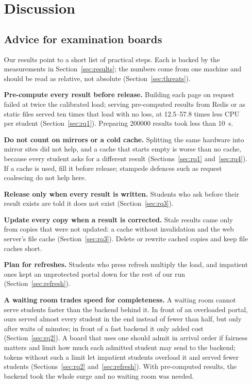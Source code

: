 \section{Discussion}
\label{sec:discussion}

\subsection{Advice for examination boards}

Our results point to a short list of practical steps. Each is backed by the
measurements in Section~\ref{sec:results}; the numbers come from one machine
and should be read as relative, not absolute (Section~\ref{sec:threats}).

\textbf{Pre-compute every result before release.} Building each page on
request failed at twice the calibrated load; serving pre-computed results from
Redis or as static files served ten times that load with no loss, at
12.5--57.8 times less CPU per student (Section~\ref{sec:rq1}). Preparing
\num{200000} results took less than \SI{10}{s}.

\textbf{Do not count on mirrors or a cold cache.} Splitting the same hardware
into mirror sites did not help, and a cache that starts empty is worse than no
cache, because every student asks for a different result
(Sections~\ref{sec:rq1} and~\ref{sec:rq4}). If a cache is used, fill it before
release; stampede defences such as request coalescing do not help here.

\textbf{Release only when every result is written.} Students who ask before
their result exists are told it does not exist (Section~\ref{sec:rq3}).

\textbf{Update every copy when a result is corrected.} Stale results came only
from copies that were not updated: a cache without invalidation and the web
server's file cache (Section~\ref{sec:rq3}). Delete or rewrite cached copies
and keep file caches short.

\textbf{Plan for refreshes.} Students who press refresh multiply the load, and
impatient ones kept an unprotected portal down for the rest of our run
(Section~\ref{sec:refresh}).

\textbf{A waiting room trades speed for completeness.} A waiting room cannot
serve students faster than the backend behind it. In front of an overloaded
portal, ours served almost every student in the end instead of fewer than
half, but only after waits of minutes; in front of a fast backend it only
added cost (Section~\ref{sec:rq2}). A board that uses one should admit in
arrival order if fairness matters and limit how much each admitted student may
send to the backend; tokens without such a limit let impatient students
overload it and served fewer students (Sections~\ref{sec:rq2}
and~\ref{sec:refresh}). With pre-computed results, the backend took the whole
surge and no waiting room was needed.


